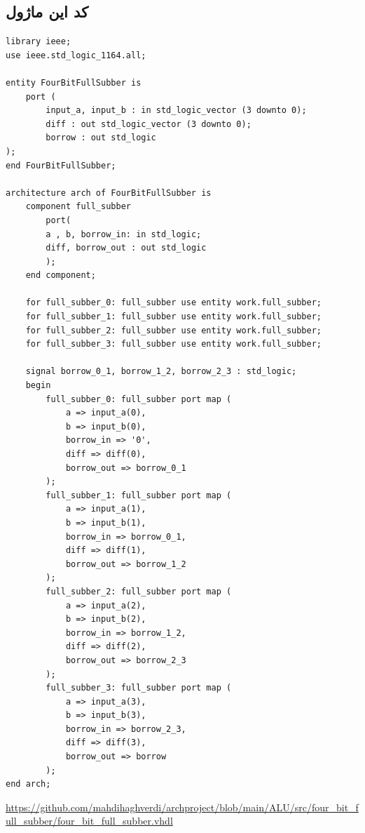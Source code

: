 \documentclass[dvipsnames, svgnames, x11names, a4paper, 11pt, oneside]{book}
\begin{document}
				\subsection{کد این ماژول}
					\begin{latin}
						
						\begin{lstlisting}
library ieee;
use ieee.std_logic_1164.all;

entity FourBitFullSubber is
	port (
		input_a, input_b : in std_logic_vector (3 downto 0);
		diff : out std_logic_vector (3 downto 0);
		borrow : out std_logic
);
end FourBitFullSubber;

architecture arch of FourBitFullSubber is
	component full_subber
		port(
		a , b, borrow_in: in std_logic;
		diff, borrow_out : out std_logic
		);
	end component;
	
	for full_subber_0: full_subber use entity work.full_subber;
	for full_subber_1: full_subber use entity work.full_subber;
	for full_subber_2: full_subber use entity work.full_subber;
	for full_subber_3: full_subber use entity work.full_subber;
	
	signal borrow_0_1, borrow_1_2, borrow_2_3 : std_logic;
	begin
		full_subber_0: full_subber port map (
			a => input_a(0),
			b => input_b(0),
			borrow_in => '0',
			diff => diff(0),
			borrow_out => borrow_0_1
		);
		full_subber_1: full_subber port map (
			a => input_a(1),
			b => input_b(1),
			borrow_in => borrow_0_1,
			diff => diff(1),
			borrow_out => borrow_1_2
		);
		full_subber_2: full_subber port map (
			a => input_a(2),
			b => input_b(2),
			borrow_in => borrow_1_2,
			diff => diff(2),
			borrow_out => borrow_2_3
		);
		full_subber_3: full_subber port map (
			a => input_a(3),
			b => input_b(3),
			borrow_in => borrow_2_3,
			diff => diff(3),
			borrow_out => borrow
		);
end arch;
						\end{lstlisting}
						\url{https://github.com/mahdihaghverdi/archproject/blob/main/ALU/src/four_bit_full_subber/four_bit_full_subber.vhdl}
					\end{latin}
\end{document}
